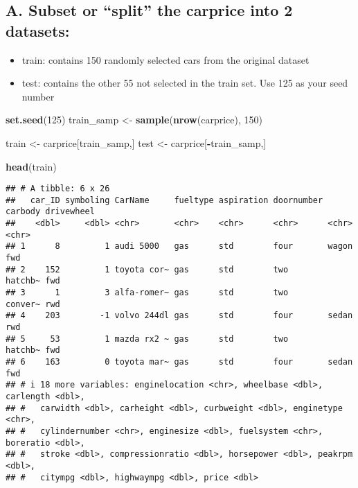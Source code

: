 \documentclass[
]{article}
\newenvironment{Shaded}{\begin{snugshade}}{\end{snugshade}}
\newcommand{\DecValTok}[1]{\textcolor[rgb]{0.00,0.00,0.81}{#1}}
\newcommand{\FunctionTok}[1]{\textcolor[rgb]{0.13,0.29,0.53}{\textbf{#1}}}
\newcommand{\NormalTok}[1]{#1}
\newcommand{\OtherTok}[1]{\textcolor[rgb]{0.56,0.35,0.01}{#1}}
\newcommand{\SpecialCharTok}[1]{\textcolor[rgb]{0.81,0.36,0.00}{\textbf{#1}}}
\providecommand{\tightlist}{%
  \setlength{\itemsep}{0pt}\setlength{\parskip}{0pt}}
\begin{document}
\subsection{A. Subset or ``split'' the carprice into 2
datasets:}\label{a.-subset-or-split-the-carprice-into-2-datasets}

\begin{itemize}
\tightlist
\item
  train: contains 150 randomly selected cars from the original dataset
\item
  test: contains the other 55 not selected in the train set. Use 125 as
  your seed number
\end{itemize}

\begin{Shaded}
\begin{Highlighting}[]
\FunctionTok{set.seed}\NormalTok{(}\DecValTok{125}\NormalTok{)}
\NormalTok{train\_samp }\OtherTok{\textless{}{-}} \FunctionTok{sample}\NormalTok{(}\FunctionTok{nrow}\NormalTok{(carprice), }\DecValTok{150}\NormalTok{)}

\NormalTok{train }\OtherTok{\textless{}{-}}\NormalTok{ carprice[train\_samp,]}
\NormalTok{test }\OtherTok{\textless{}{-}}\NormalTok{ carprice[}\SpecialCharTok{{-}}\NormalTok{train\_samp,]}

\FunctionTok{head}\NormalTok{(train)}
\end{Highlighting}
\end{Shaded}

\begin{verbatim}
## # A tibble: 6 x 26
##   car_ID symboling CarName     fueltype aspiration doornumber carbody drivewheel
##    <dbl>     <dbl> <chr>       <chr>    <chr>      <chr>      <chr>   <chr>     
## 1      8         1 audi 5000   gas      std        four       wagon   fwd       
## 2    152         1 toyota cor~ gas      std        two        hatchb~ fwd       
## 3      1         3 alfa-romer~ gas      std        two        conver~ rwd       
## 4    203        -1 volvo 244dl gas      std        four       sedan   rwd       
## 5     53         1 mazda rx2 ~ gas      std        two        hatchb~ fwd       
## 6    163         0 toyota mar~ gas      std        four       sedan   fwd       
## # i 18 more variables: enginelocation <chr>, wheelbase <dbl>, carlength <dbl>,
## #   carwidth <dbl>, carheight <dbl>, curbweight <dbl>, enginetype <chr>,
## #   cylindernumber <chr>, enginesize <dbl>, fuelsystem <chr>, boreratio <dbl>,
## #   stroke <dbl>, compressionratio <dbl>, horsepower <dbl>, peakrpm <dbl>,
## #   citympg <dbl>, highwaympg <dbl>, price <dbl>
\end{verbatim}
\end{document}
